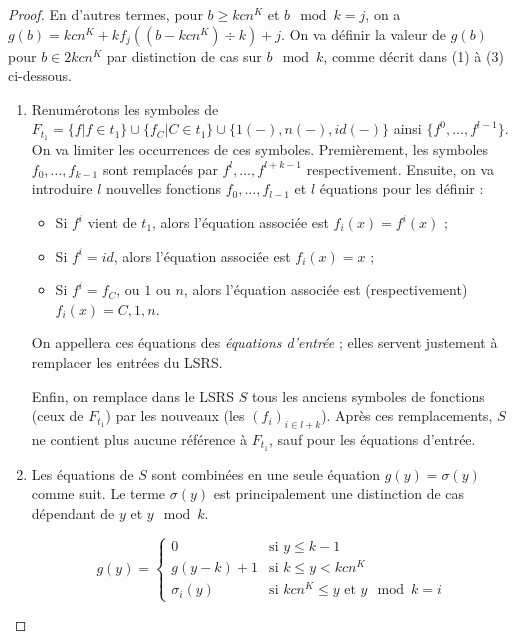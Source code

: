 \documentclass{report}
\begin{document}
\begin{proof}
{\begin{minipage}{0.9\textwidth}
				\end{minipage}
			}
				
				\espace
			
			
			En d'autres termes, pour $b \geqslant kcn^K$ et $b \mod{k} = j$, on a $g(b) = kcn^K + k f_j\left( (b-kcn^K) \div k \right) + j$.
			On va définir la valeur de $g(b)$ pour $b \in 2kcn^K$ par distinction de cas sur $b \mod{k}$, comme décrit dans (1) à (3) ci-dessous.
			
			\begin{enumerate}[itemsep=-1mm,leftmargin=2cm]
				\item  
					Renumérotons les symboles de $F_{t_1} = \{f | f \in t_1\} \cup \{f_C | C \in t_1\} \cup \{1(-), n(-), id(-)\}$ ainsi $\{ f^0, \dots, f^{l-1} \}$. On va limiter les occurrences de ces symboles. Premièrement, les symboles $f_0, \dots, f_{k-1}$ sont remplacés par $f^{l}, \dots, f^{l+k-1}$ respectivement. Ensuite, on va introduire $l$ nouvelles fonctions $f_0, \dots, f_{l-1}$ et $l$ équations pour les définir :
					
						\begin{itemize}[itemsep=-1mm,leftmargin=1cm]
							\item	Si $f^i$ vient de $t_1$, alors l'équation associée est $f_i(x) = f^i(x)$ ;
							\item 	Si $f^i = id$, alors l'équation associée est $f_i(x) = x$ ;
							\item 	Si $f^i = f_C$, ou $1$ ou $n$, alors l'équation associée est (respectivement) $f_i(x) = C, 1, n$. 
						\end{itemize}
				
					
					On appellera ces équations des \emph{équations d'entrée} ; elles servent justement à remplacer les entrées du LSRS.
					
					Enfin, on remplace dans le LSRS $S$ tous les anciens symboles de fonctions (ceux de $F_{t_1}$) par les nouveaux (les $(f_i)_{i \in l+k}$). Après ces remplacements, $S$ ne contient plus aucune référence à $F_{t_1}$, sauf pour les équations d'entrée. 
					
				\item 	
					Les équations de $S$ sont combinées en une seule équation $g(y) = \sigma(y)$ comme suit. Le terme $\sigma(y)$ est principalement une distinction de cas dépendant de $y$ et $y \mod{k}$. 
				
					\[
						g(y) = 
							\left\lbrace \begin{array}{ll}
								0 				& \text{si $y \leqslant k-1$} \\
								g(y-k) + 1 		& \text{si $k \leqslant y < kcn^K$} \\
								\sigma_i(y)		& \text{si $kcn^K \leqslant y$ et $y \mod{k} = i$}
							\end{array}\right.
					\]
					

\end{enumerate}
\end{proof}
\end{document}
